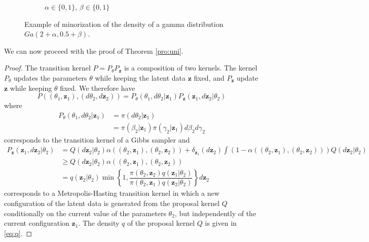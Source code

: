 \documentclass[12pt]{article}
\begin{document}
\begin{figure}
\begin{center}
\begin{subfigure}[b]{0.32\textwidth}
			\caption{$\alpha \in \{0,1\}$, $\beta \in \{0,1\}$}
			\label{fig:gam2}
		\end{subfigure}
	\end{center}
	\caption{Example of minorization of the density of a gamma distribution $Ga(2+\alpha, 0.5+\beta)$.
		\label{fig:gam}}
\end{figure}

We can now proceed with the proof of Theorem \ref{pro:uni}.

\begin{proof}
	The transition kernel $P = P_{\theta} P_{\mathbf{z}}$ is a composition of two kernels. The kernel $P_{\theta}$ updates the parameters $\theta$ while keeping the latent data $\mathbf{z}$ fixed, and $P_{\mathbf{z}}$ update $\mathbf{z}$ while keeping $\theta$ fixed. %
	We therefore have
	$$P((\theta_1, \mathbf{z}_1), (d\theta_2, d\mathbf{z}_2)) = P_\theta(\theta_1, d\theta_2 | \mathbf{z}_1) P_\mathbf{z}(\mathbf{z}_1, d\mathbf{z}_2 | \theta_2)$$
	where
	\begin{align}
		\label{eq:Pth}
		P_\theta(\theta_1, d\theta_2 | \mathbf{z}_1)
		& = \pi(d\theta_2 | \mathbf{z}_1) \\
		& = \pi(\beta_2 | \mathbf{z}_1) \pi(\gamma_2 | \mathbf{z}_1) d\beta_2 d\gamma_2 \nonumber
	\end{align}
	corresponds to the transition kernel of a Gibbs sampler and
	\begin{align}
		\label{eq:Pz}
		P_\mathbf{z}(\mathbf{z}_1, d\mathbf{z}_2 | \theta_2)
		& = Q(d\mathbf{z}_2 | \theta_2) \alpha((\theta_2, \mathbf{z}_1),(\theta_2, \mathbf{z}_2)) + \delta_{\mathbf{z}_1}(d\mathbf{z}_2)\int(1-\alpha((\theta_2, \mathbf{z}_1),(\theta_2, \mathbf{z}_2))) Q(d\mathbf{z}_2| \theta_2) \nonumber \\
		& \ge Q(d\mathbf{z}_2| \theta_2) \alpha((\theta_2, \mathbf{z}_1),(\theta_2, \mathbf{z}_2)) \\
		& = q(\mathbf{z}_2| \theta_2) \min\left\lbrace 1, \dfrac{\pi(\theta_2, \mathbf{z}_2)q(\mathbf{z}_1| \theta_2)}{\pi(\theta_2, \mathbf{z}_1)q(\mathbf{z}_2| \theta_2)} \right\rbrace d\mathbf{z}_2 \nonumber
	\end{align}
	corresponds to a Metropolis-Hasting transition kernel in which a new configuration of the latent data is generated from the proposal kernel $Q$ conditionally on the current value of the parameters $\theta_2$, but independently of the current configuration $\mathbf{z}_1$. The density $q$ of the proposal kernel $Q$ is given in \eqref{eq:q}.
	

\end{proof}
\end{document}
